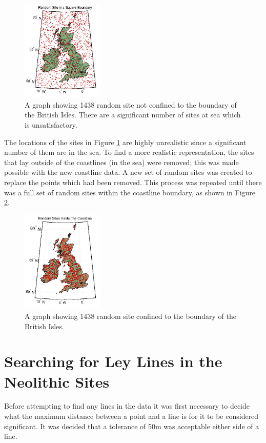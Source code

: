 \documentclass[a4paper]{article}
\begin{document}
\begin{figure}[H]
\centering
\includegraphics[width=0.35\textwidth]{RSSBv2.png}
\caption{\label{fig:RSSB}A graph showing 1438 random site not confined to the boundary of the British Isles. There are a significant number of sites at sea which is unsatisfactory.}
\end{figure}

The locations of the sites in Figure \ref{fig:RSSB} are highly unrealistic since a significant number of them are in the sea. To find a more realistic representation, the sites that lay outside of the coastlines (in the sea) were removed; this was made possible with the new coastline data. A new set of random sites was created to replace the points which had been removed. This process was repeated until there was a full set of random sites within the coastline boundary, as shown in Figure \ref{fig:RSC}.

\begin{figure}[H]
\centering
\includegraphics[width=0.35\textwidth]{RSC.png}
\caption{\label{fig:RSC}A graph showing 1438 random site confined to the boundary of the British Isles.}
\end{figure}

\section{Searching for Ley Lines in the Neolithic Sites}
Before attempting to find any lines in the data it was first necessary to decide what the maximum distance between a point and a line is for it to be considered significant. It was decided that a tolerance of 50m was acceptable either side of a line.
\end{document}
